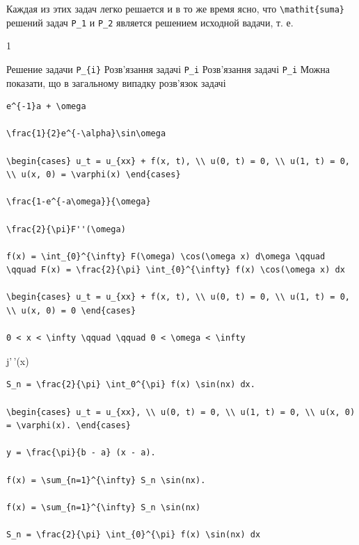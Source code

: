\documentclass[
  ukrainian,
]{article}
\begin{document}
Каждая из этих задач легко решается и в то же время ясно, что
\texttt{\textbackslash{}mathit\{suma\}} решений задач \texttt{P\_1} и
\texttt{P\_2} является решением исходной вадачи, т. е.

1

Решение задачи \texttt{P\_\{i\}} Розв'язання задачі \texttt{P\_i}
Розв'язання задачі \texttt{P\_i} Можна показати, що в загальному випадку
розв'язок задачі

\begin{verbatim}
e^{-1}a + \omega

\frac{1}{2}e^{-\alpha}\sin\omega

\begin{cases} u_t = u_{xx} + f(x, t), \\ u(0, t) = 0, \\ u(1, t) = 0, \\ u(x, 0) = \varphi(x) \end{cases}

\frac{1-e^{-a\omega}}{\omega}

\frac{2}{\pi}F''(\omega)

f(x) = \int_{0}^{\infty} F(\omega) \cos(\omega x) d\omega \qquad \qquad F(x) = \frac{2}{\pi} \int_{0}^{\infty} f(x) \cos(\omega x) dx

\begin{cases} u_t = u_{xx} + f(x, t), \\ u(0, t) = 0, \\ u(1, t) = 0, \\ u(x, 0) = 0 \end{cases}

0 < x < \infty \qquad \qquad 0 < \omega < \infty
\end{verbatim}

j'\,'(x)

\begin{verbatim}
S_n = \frac{2}{\pi} \int_0^{\pi} f(x) \sin(nx) dx.

\begin{cases} u_t = u_{xx}, \\ u(0, t) = 0, \\ u(1, t) = 0, \\ u(x, 0) = \varphi(x). \end{cases}

y = \frac{\pi}{b - a} (x - a).

f(x) = \sum_{n=1}^{\infty} S_n \sin(nx).

f(x) = \sum_{n=1}^{\infty} S_n \sin(nx)

S_n = \frac{2}{\pi} \int_{0}^{\pi} f(x) \sin(nx) dx
\end{verbatim}
\end{document}
